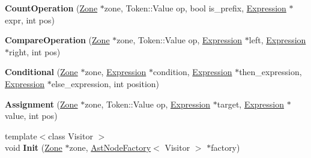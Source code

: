 \begin{DoxyCompactItemize}
\item 
\hypertarget{classv8_1_1internal_1_1_v8___f_i_n_a_l_aca76e3452b372de0961e166bbb30a587}{}{\bfseries Count\+Operation} (\hyperlink{classv8_1_1internal_1_1_zone}{Zone} $\ast$zone, Token\+::\+Value op, bool is\+\_\+prefix, \hyperlink{classv8_1_1internal_1_1_expression}{Expression} $\ast$expr, int pos)\label{classv8_1_1internal_1_1_v8___f_i_n_a_l_aca76e3452b372de0961e166bbb30a587}

\item 
\hypertarget{classv8_1_1internal_1_1_v8___f_i_n_a_l_a78eb78b9fdbe361885173fa50c98bc29}{}{\bfseries Compare\+Operation} (\hyperlink{classv8_1_1internal_1_1_zone}{Zone} $\ast$zone, Token\+::\+Value op, \hyperlink{classv8_1_1internal_1_1_expression}{Expression} $\ast$left, \hyperlink{classv8_1_1internal_1_1_expression}{Expression} $\ast$right, int pos)\label{classv8_1_1internal_1_1_v8___f_i_n_a_l_a78eb78b9fdbe361885173fa50c98bc29}

\item 
\hypertarget{classv8_1_1internal_1_1_v8___f_i_n_a_l_ad417541d052af18d747a4f70b348795d}{}{\bfseries Conditional} (\hyperlink{classv8_1_1internal_1_1_zone}{Zone} $\ast$zone, \hyperlink{classv8_1_1internal_1_1_expression}{Expression} $\ast$condition, \hyperlink{classv8_1_1internal_1_1_expression}{Expression} $\ast$then\+\_\+expression, \hyperlink{classv8_1_1internal_1_1_expression}{Expression} $\ast$else\+\_\+expression, int position)\label{classv8_1_1internal_1_1_v8___f_i_n_a_l_ad417541d052af18d747a4f70b348795d}

\item 
\hypertarget{classv8_1_1internal_1_1_v8___f_i_n_a_l_aa36379dc90340e10fd19a6a09014ab5e}{}{\bfseries Assignment} (\hyperlink{classv8_1_1internal_1_1_zone}{Zone} $\ast$zone, Token\+::\+Value op, \hyperlink{classv8_1_1internal_1_1_expression}{Expression} $\ast$target, \hyperlink{classv8_1_1internal_1_1_expression}{Expression} $\ast$value, int pos)\label{classv8_1_1internal_1_1_v8___f_i_n_a_l_aa36379dc90340e10fd19a6a09014ab5e}

\item 
\hypertarget{classv8_1_1internal_1_1_v8___f_i_n_a_l_a6cfbb1b0fe75dd21361cd6afdb0bf42f}{}{\footnotesize template$<$class Visitor $>$ }\\void {\bfseries Init} (\hyperlink{classv8_1_1internal_1_1_zone}{Zone} $\ast$zone, \hyperlink{classv8_1_1internal_1_1_ast_node_factory}{Ast\+Node\+Factory}$<$ Visitor $>$ $\ast$factory)\label{classv8_1_1internal_1_1_v8___f_i_n_a_l_a6cfbb1b0fe75dd21361cd6afdb0bf42f}


\end{DoxyCompactItemize}
